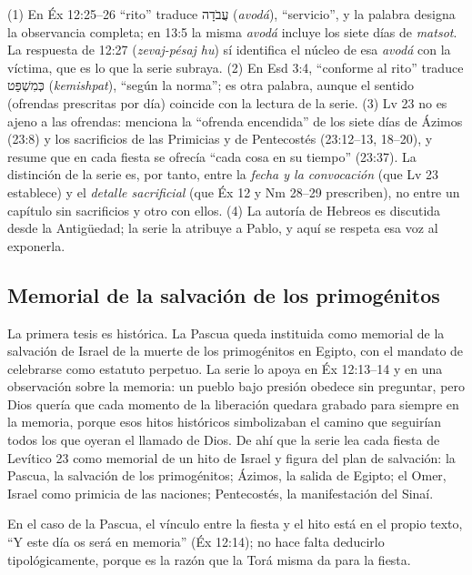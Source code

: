 \documentclass[11pt,letterpaper]{article}
\newcommand{\heb}[1]{\mbox{\foreignlanguage{hebrew}{#1}}}
\begin{document}
\begin{nota}[Precisión]
(1) En Éx 12:25--26 ``rito'' traduce \heb{עֲבֹדָה} (\emph{avodá}), ``servicio'', y la palabra designa la observancia completa; en 13:5 la misma \emph{avodá} incluye los siete días de \emph{matsot}. La respuesta de 12:27 (\emph{zevaj-pésaj hu}) sí identifica el núcleo de esa \emph{avodá} con la víctima, que es lo que la serie subraya. (2) En Esd 3:4, ``conforme al rito'' traduce \heb{כְּמִשְׁפַּט} (\emph{kemishpat}), ``según la norma''; es otra palabra, aunque el sentido (ofrendas prescritas por día) coincide con la lectura de la serie. (3) Lv 23 no es ajeno a las ofrendas: menciona la ``ofrenda encendida'' de los siete días de Ázimos (23:8) y los sacrificios de las Primicias y de Pentecostés (23:12--13, 18--20), y resume que en cada fiesta se ofrecía ``cada cosa en su tiempo'' (23:37). La distinción de la serie es, por tanto, entre la \emph{fecha y la convocación} (que Lv 23 establece) y el \emph{detalle sacrificial} (que Éx 12 y Nm 28--29 prescriben), no entre un capítulo sin sacrificios y otro con ellos. (4) La autoría de Hebreos es discutida desde la Antigüedad; la serie la atribuye a Pablo, y aquí se respeta esa voz al exponerla.
\end{nota}

\subsection{Memorial de la salvación de los primogénitos}
La primera tesis es histórica. La Pascua queda instituida como memorial de la salvación de Israel de la muerte de los primogénitos en Egipto, con el mandato de celebrarse como estatuto perpetuo. La serie lo apoya en Éx 12:13--14 y en una observación sobre la memoria: un pueblo bajo presión obedece sin preguntar, pero Dios quería que cada momento de la liberación quedara grabado para siempre en la memoria, porque esos hitos históricos simbolizaban el camino que seguirían todos los que oyeran el llamado de Dios. De ahí que la serie lea cada fiesta de Levítico 23 como memorial de un hito de Israel y figura del plan de salvación: la Pascua, la salvación de los primogénitos; Ázimos, la salida de Egipto; el Omer, Israel como primicia de las naciones; Pentecostés, la manifestación del Sinaí.

En el caso de la Pascua, el vínculo entre la fiesta y el hito está en el propio texto, ``Y este día os será en memoria'' (Éx 12:14); no hace falta deducirlo tipológicamente, porque es la razón que la Torá misma da para la fiesta.
\end{document}
